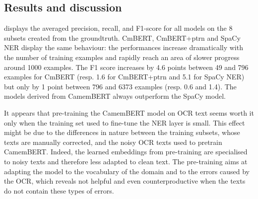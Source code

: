 


\subsection{Results and discussion}
 displays the averaged precision, recall, and F1-score for all models on the 8 subsets created from the groundtruth.
CmBERT, CmBERT+ptrn and SpaCy NER display the same behaviour: the performances increase dramatically with the number of training examples and rapidly reach an area of slower progress around 1000 examples.
The F1 score increases by 4.6 points between 49 and 796 examples for CmBERT (resp. 1.6 for CmBERT+ptrn and 5.1 for SpaCy NER) but only by 1 point between 796 and 6373 examples (resp. 0.6 and 1.4).
The models derived from CamemBERT always outperform the SpaCy model.

It appears that pre-training the CamemBERT model on OCR text seems worth it only when the training set used to fine-tune the NER layer is small.
This effect might be due to the differences in nature between the training subsets, whose texts are manually corrected, and the noisy OCR texts used to pretrain CamemBERT.
Indeed, the learned embeddings from pre-training are specialised to noisy texts and therefore less adapted to clean text.
The pre-training aims at adapting the model to the vocabulary of the domain and to the errors caused by the OCR, which reveals not helpful and even counterproductive when the texts do not contain these types of errors.

